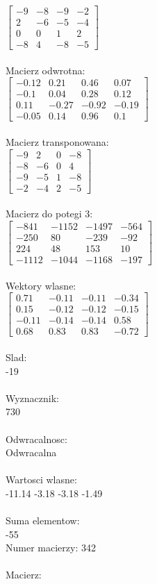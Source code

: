 \documentclass[a4paper,12pt]{article}
\begin{document}
$\begin{bmatrix} -9&-8&-9&-2\\2&-6&-5&-4\\0&0&1&2\\-8&4&-8&-5 \end{bmatrix}$
\\
\\
Macierz odwrotna:\\

$\begin{bmatrix} -0.12&0.21&0.46&0.07\\-0.1&0.04&0.28&0.12\\0.11&-0.27&-0.92&-0.19\\-0.05&0.14&0.96&0.1 \end{bmatrix}$
\\
\\
Macierz transponowana:\\

$\begin{bmatrix} -9&2&0&-8\\-8&-6&0&4\\-9&-5&1&-8\\-2&-4&2&-5 \end{bmatrix}$
\\
\\
Macierz do potegi 3:\\

$\begin{bmatrix} -841&-1152&-1497&-564\\-250&80&-239&-92\\224&48&153&10\\-1112&-1044&-1168&-197 \end{bmatrix}$
\\
\\
Wektory wlasne:\\

$\begin{bmatrix} 0.71&-0.11&-0.11&-0.34\\0.15&-0.12&-0.12&-0.15\\-0.11&-0.14&-0.14&0.58\\0.68&0.83&0.83&-0.72 \end{bmatrix}$
\\
\\
Slad:\\
-19
\\
\\
Wyznacznik:\\
730
\\
\\
Odwracalnosc:\\
Odwracalna
\\
\\
Wartosci wlasne:\\
-11.14 -3.18 -3.18 -1.49
\\
\\
Suma elementow:\\
-55
\\
\newpage
Numer macierzy:
342
\\
\\
Macierz:\\
\end{document}
